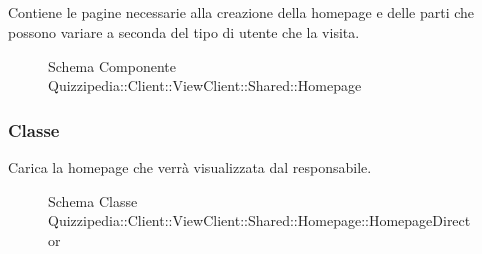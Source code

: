 \subsection{}
Contiene le pagine necessarie alla creazione della homepage e delle parti che possono variare a seconda del tipo di utente che la visita.
\begin{figure}[H]
\centering
\noindent{}
\caption[Schema Componente Quizzipedia::Client::ViewClient::Shared::Homepage]{Schema Componente Quizzipedia::Client::ViewClient::Shared::Homepage}
\end{figure}
\subsubsection{Classe }
Carica la homepage che verrà visualizzata dal responsabile.
\begin{figure}[H]
\centering
\noindent{}
\caption[Schema Classe HomepageDirector]{Schema Classe Quizzipedia::Client::ViewClient::Shared::Homepage::HomepageDirector}
\end{figure}
